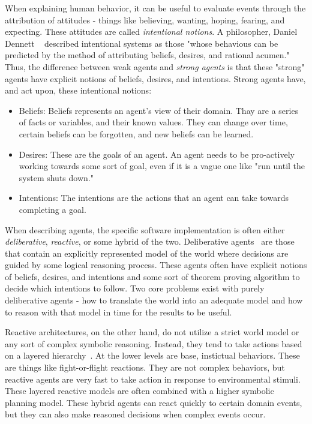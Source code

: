 \documentclass{sig-alternate}
\newcounter{over}
\newenvironment{smallitem}
 {\setlength{\topsep}{0pt}
  \setlength{\partopsep}{0pt}
  \setlength{\parskip}{0pt}
  \begin{itemize}
   \setlength{\leftmargin}{.2in}
  \setlength{\parsep}{0pt}
  \setlength{\parskip}{0pt}
  \setlength{\itemsep}{0pt}}
 {\end{itemize}}
\newcommand{\bi}{\begin{smallitem}}
\newcommand{\ei}{\end{smallitem}}
\begin{document}
When explaining human behavior, it can be useful to evaluate events 
through the attribution of attitudes - things like believing, wanting,
hoping, fearing, and expecting. These attitudes are called {\em
intentional notions}. A philosopher, Daniel Dennett ~\cite{dennett87}
described intentional systems as those "whose behavious can be predicted
by the method of attributing beliefs, desires, and rational acumen." 
Thus, the difference between weak agents and {\em strong agents} is that
these "strong" agents have explicit notions of beliefs, desires, and
intentions. Strong agents have, and act upon, these intentional notions:
\bi
\item Beliefs: Beliefs represents an agent's view of their domain. 
Thay are a series of facts or variables, and their known values.
They can change over time, certain beliefs can
be forgotten, and new beliefs can be learned. 
\item Desires: These are the goals of an agent. An agent needs to be
pro-actively working towards some sort of goal, even if it is a vague
one like "run until the system shuts down."
\item Intentions: The intentions are the actions that an agent can take
towards completing a goal.  
\ei

When describing agents, the specific software implementation is often
either {\em deliberative}, {\em reactive}, or some hybrid of the two. 
Deliberative agents~\cite{genesereth87} are those that contain an explicitly represented 
model of the world where decisions are guided by some logical reasoning
process. These agents often have explicit notions of beliefs, desires, and
intentions and some sort of theorem proving algorithm to decide which
intentions to follow. Two core problems exist with purely deliberative 
agents - how to translate the world into an adequate model and how to
reason with that model in time for the results to be useful. 

Reactive architectures, on the other hand, do not utilize a strict
world model or any sort of complex symbolic reasoning. Instead, they tend
to take actions based on a layered hierarchy~\cite{brooks86}. At the lower levels are
base, instictual behaviors. These are things like fight-or-flight 
reactions. They are not complex behaviors, but reactive agents are 
very fast to take action in response to environmental stimuli. These
layered reactive models are often combined with a higher symbolic planning
model. These hybrid agents can react quickly to certain domain events, 
but they can also make reasoned decisions when complex events occur.
\end{document}
